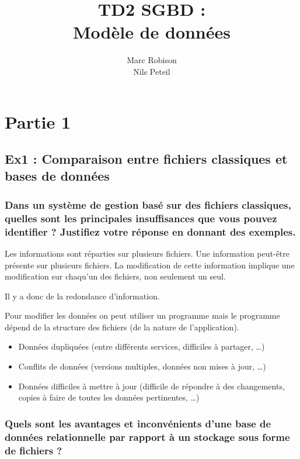 \documentclass{article}
\title{TD2 SGBD : \\Modèle de données}
\author{Marc Robison\\
	Nils Peteil}
\begin{document}
\maketitle

\tableofcontents 

\section{Partie 1}
\subsection{Ex1 : Comparaison entre fichiers classiques et bases de données}
\subsubsection{Dans un système de gestion basé sur des fichiers classiques, quelles sont les principales insuffisances que vous pouvez identifier ? Justifiez votre réponse en donnant des exemples.} \par \vspace{3mm}

Les informations sont réparties sur plusieurs fichiers. Une information peut-être présente sur plusieurs fichiers. La modification de cette information implique une modification sur chaqu'un des fichiers, non seulement un seul.

Il y a donc de la redondance d'information.

Pour modifier les données on peut utiliser un programme mais le programme dépend de la structure des fichiers (de la nature de l'application).

\begin{itemize}
  \item Données dupliquées (entre différents services, difficiles à partager, …)
  \item Conflits de données (versions multiples, données non mises à jour, …)
  \item Données difficiles à mettre à jour (difficile de répondre à des changements, copies à
faire de toutes les données pertinentes, …)
\end {itemize}


\subsubsection{Quels sont les avantages et inconvénients d’une base de données relationnelle par rapport à un stockage sous forme de fichiers ?}
\vspace{3mm}
\end{document}
